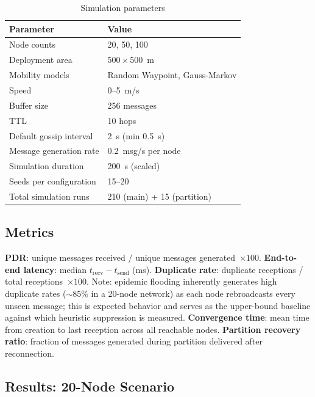 \documentclass[conference]{IEEEtran}
\begin{document}
\begin{table}[!t]
  \centering
  \caption{Simulation parameters}
  \label{tab:params}
  \begin{tabular}{ll}
    \toprule
    \textbf{Parameter} & \textbf{Value} \\
    \midrule
    Node counts              & 20, 50, 100 \\
    Deployment area          & $500\times500$~m \\
    Mobility models          & Random Waypoint, Gauss-Markov \\
    Speed                    & 0--5~m/s \\
    Buffer size              & 256 messages \\
    TTL                      & 10 hops \\
    Default gossip interval  & 2~s (min 0.5~s) \\
    Message generation rate  & 0.2~msg/s per node \\
    Simulation duration      & 200~s (scaled) \\
    Seeds per configuration  & 15--20 \\
    Total simulation runs    & 210 (main) + 15 (partition) \\
    \bottomrule
  \end{tabular}
\end{table}

\subsection{Metrics}
\textbf{PDR}: unique messages received / unique messages generated~$\times100$.
\textbf{End-to-end latency}: median $t_\mathrm{recv}-t_\mathrm{send}$ (ms).
\textbf{Duplicate rate}: duplicate receptions / total receptions~$\times100$.
Note: epidemic flooding inherently generates high duplicate rates
($\sim$85\% in a 20-node network) as each node rebroadcasts every unseen
message; this is expected behavior and serves as the upper-bound baseline
against which heuristic suppression is measured.
\textbf{Convergence time}: mean time from creation to last reception across
all reachable nodes.
\textbf{Partition recovery ratio}: fraction of messages generated during
partition delivered after reconnection.

\subsection{Results: 20-Node Scenario}
\end{document}
